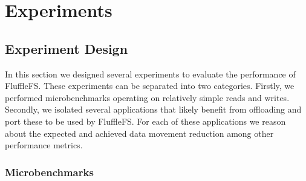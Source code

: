
\chapter{Experiments} %



\ifpdf
    \graphicspath{{7/figures/PNG/}{7/figures/PDF/}{7/figures/}}
\else
    \graphicspath{{7/figures/EPS/}{7/figures/}}
\fi


% 

\section{Experiment Design}

In this section we designed several experiments to evaluate the performance of
FluffleFS. These experiments can be separated into two categories. Firstly,
we performed microbenchmarks operating on relatively simple reads and writes.
Secondly, we isolated several applications that likely benefit from offloading
and port these to be used by FluffleFS. For each of these applications we reason
about the expected and achieved data movement reduction among other performance
metrics.

\subsection{Microbenchmarks}

